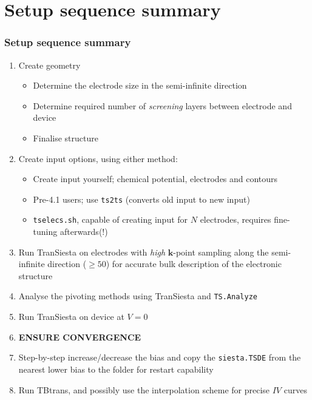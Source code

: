 \section{Setup sequence summary}

\begin{frame}
  \frametitle{Setup sequence summary}

  \begin{enumerate}[<+->]

    \item Create geometry
    \begin{itemize}
      \item Determine the electrode size in the semi-infinite direction

      \item Determine required number of \emph{screening} layers between electrode and device
      \item Finalise structure
    \end{itemize}

    \item Create input options, using either method:
    \begin{itemize}
      \item Create input yourself; chemical potential, electrodes and contours

      \item Pre-4.1 users; use \texttt{ts2ts} (converts old input to new input)

      \item \texttt{tselecs.sh}, capable of creating input for $N$ electrodes, requires
      fine-tuning afterwards(!)

    \end{itemize}
    
    \item Run TranSiesta on electrodes with \emph{high} $\mathbf k$-point sampling along
    the semi-infinite direction ($\ge50$)
    for accurate bulk description of the electronic structure

    \item Analyse the pivoting methods using TranSiesta and \texttt{TS.Analyze}

    \item Run TranSiesta on device at $V=0$

    \item \textbf{ENSURE CONVERGENCE}

    \item Step-by-step increase/decrease the bias and copy the \texttt{siesta.TSDE} from
    the nearest lower bias to the folder for restart capability

    \item Run TBtrans, and possibly use the interpolation scheme for precise $IV$ curves
    
  \end{enumerate}

\end{frame}

